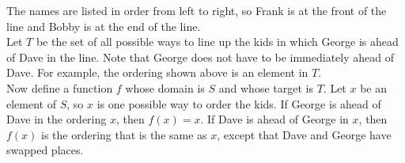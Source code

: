 \documentclass{amsart}
\theoremstyle{definition}
\theoremstyle{Exercise}
\theoremstyle{remark}
\theoremstyle{rule}
\numberwithin{equation}{section}
\begin{document}
The names are listed in order from left to right, so Frank is at the front of the line and Bobby is at the end of the line.\\

Let $T$ be the set of all possible ways to line up the kids in which George is ahead of Dave in the line. Note that George does not have to be immediately ahead of Dave. For example, the ordering shown above is an element in $T$.\\

Now define a function $f$ whose domain is $S$ and whose target is $T$. Let $x$ be an element of $S$, so $x$ is one possible way to order the kids. If George is ahead of Dave in the ordering $x$, then $f(x) = x$. If Dave is ahead of George in $x$, then $f(x)$ is the ordering that is the same as $x$, except that Dave and George have swapped places.\\

\end{document}
